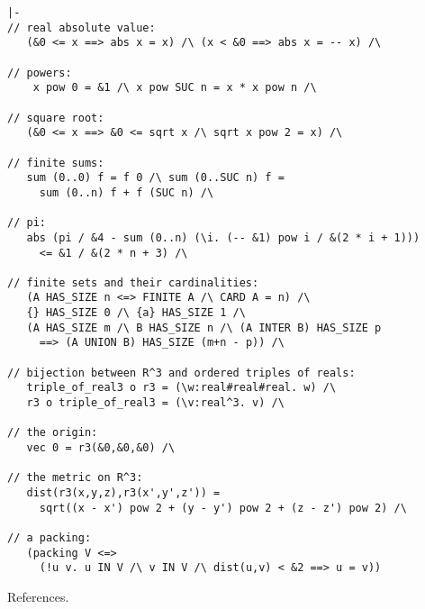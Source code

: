 \begin{obeylines}

\begin{verbatim}
|-  
// real absolute value:
   (&0 <= x ==> abs x = x) /\ (x < &0 ==> abs x = -- x) /\   

// powers:
    x pow 0 = &1 /\ x pow SUC n = x * x pow n /\

// square root:
   (&0 <= x ==> &0 <= sqrt x /\ sqrt x pow 2 = x) /\ 

// finite sums:
   sum (0..0) f = f 0 /\ sum (0..SUC n) f =  
     sum (0..n) f + f (SUC n) /\ 

// pi:
   abs (pi / &4 - sum (0..n) (\i. (-- &1) pow i / &(2 * i + 1))) 
     <= &1 / &(2 * n + 3) /\

// finite sets and their cardinalities:
   (A HAS_SIZE n <=> FINITE A /\ CARD A = n) /\
   {} HAS_SIZE 0 /\ {a} HAS_SIZE 1 /\ 
   (A HAS_SIZE m /\ B HAS_SIZE n /\ (A INTER B) HAS_SIZE p 
     ==> (A UNION B) HAS_SIZE (m+n - p)) /\

// bijection between R^3 and ordered triples of reals:
   triple_of_real3 o r3 = (\w:real#real#real. w) /\
   r3 o triple_of_real3 = (\v:real^3. v) /\ 

// the origin:
   vec 0 = r3(&0,&0,&0) /\

// the metric on R^3:
   dist(r3(x,y,z),r3(x',y',z')) = 
     sqrt((x - x') pow 2 + (y - y') pow 2 + (z - z') pow 2) /\

// a packing:
   (packing V <=> 
     (!u v. u IN V /\ v IN V /\ dist(u,v) < &2 ==> u = v))
\end{verbatim}

\end{obeylines}



References.